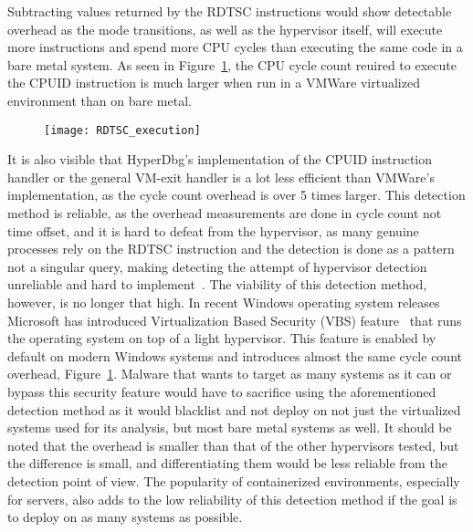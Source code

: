 Subtracting values returned by the RDTSC instructions would show detectable overhead as the mode transitions, as well as the hypervisor itself, will execute more instructions and spend more CPU cycles than executing the same code in a bare metal system. 
As seen in Figure~\ref{fig:rdtsc_overhead}, the CPU cycle count reuired to execute the CPUID instruction is much larger when run in a VMWare virtualized environment than on bare metal. 
\begin{figure}[tbh]
    \texttt{[image: RDTSC\_execution]} %
    \label{fig:rdtsc_overhead}
\end{figure}

It is also visible that HyperDbg's implementation of the CPUID instruction handler or the general VM-exit handler is a lot less efficient than VMWare's implementation, as the cycle count overhead is over 5 times larger. 
This detection method is reliable, as the overhead measurements are done in cycle count not time offset, and it is hard to defeat from the hypervisor, as many genuine processes rely on the RDTSC 
instruction and the detection is done as a pattern not a singular query, making detecting the attempt of hypervisor detection unreliable and hard to implement~\cite{hypervisor-detection-timing-attacks}. 
The viability of this detection method, however, is no longer that high. In recent Windows operating system releases Microsoft has introduced Virtualization Based Security (VBS) feature~\cite{windows-vbs} 
that runs the operating system on top of a light hypervisor. This feature is enabled by default on modern Windows systems and introduces almost the same cycle count overhead, Figure~\ref{fig:rdtsc_overhead}. 
Malware that wants to target as many systems as it can or bypass this security feature would have to sacrifice using the aforementioned detection method as it would blacklist and not deploy on not just the virtualized systems used for its analysis, 
but most bare metal systems as well. It should be noted that the overhead is smaller than that of the other hypervisors tested, but the difference is small, and differentiating them would be less reliable from the detection point of view.
The popularity of containerized environments, especially for servers, also adds to the low reliability of this detection method if the goal is to deploy on as many systems as possible.

